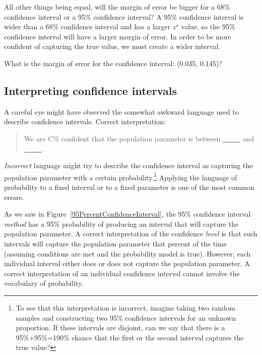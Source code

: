\begin{examplewrap}
\begin{nexample}{All other things being equal, will the margin of error be bigger for a 68\% confidence interval or a 95\% confidence interval?}
A 95\% confidence interval is wider than a 68\% confidence interval and has a larger $z^{\star}$ value, so the 95\% confidence interval will have a larger margin of error.  In order to be more confident of capturing the true value, we must create a wider interval.
\end{nexample}
\end{examplewrap}

\begin{exercisewrap}
\begin{nexercise}What is the margin of error for the confidence interval: (0.035, 0.145)?\footnotemark
\end{nexercise}
\end{exercisewrap}


\D{\newpage}

\subsection{Interpreting confidence intervals}
\label{interpretingCIs}


A careful eye might have observed the somewhat awkward language used to describe confidence intervals. Correct interpretation:
\begin{quote}
We are C\% confident that the population parameter is between \underline{\ \ \ \ \ } and \underline{\ \ \ \ \ }.
\end{quote}
\emph{Incorrect} language might try to describe the confidence interval as capturing the population parameter with a certain probability.\footnote{To see that this interpretation is incorrect, imagine taking two random samples and constructing two 95\% confidence intervals for an unknown proportion. If these intervals are disjoint, can we say that there is a 95\%+95\%=190\% chance that the first or the second interval captures the true value?} Applying the language of probability to a fixed interval or to a fixed parameter is one of the most common errors.  

As we saw in Figure~\ref{95PercentConfidenceInterval}, the 95\% confidence interval \emph{method} has a 95\% probability of producing an interval that will capture the population parameter. A correct interpretation of the confidence \emph{level} is that such intervals will capture the population parameter that percent of the time (assuming conditions are met and the probability model is true). However, each individual interval either does or does not capture the population parameter. A correct interpretation of an individual confidence interval cannot involve the vocabulary of probability.

